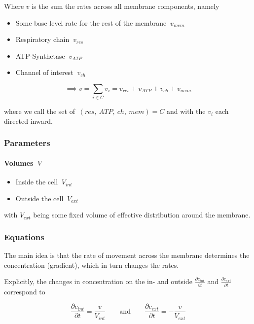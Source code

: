 \documentclass[11pt]{article}
\providecommand{\tightlist}{%
      \setlength{\itemsep}{0pt}\setlength{\parskip}{0pt}}
\begin{document}
Where \(v\) is the sum the rates across all membrane components, namely

\begin{itemize}
\tightlist
\item
  Some base level rate for the rest of the membrane \(\:v_{mem}\)
\item
  Respiratory chain \(\:v_{res}\)
\item
  ATP-Synthetase \(\:v_{ATP}\)
\item
  Channel of interest \(\:v_{ch}\)
\end{itemize}

\[\implies v = \sum_{i \in C} v_i = v_{res} + v_{ATP} + v_{ch} + v_{mem} \]

where we call the set of \(\:(res,\:ATP,\:ch,\:mem) = C\) and with the
\(v_i\) each directed inward.

    \subsubsection{Parameters}\label{parameters}

\paragraph{\texorpdfstring{Volumes
\(\:V\)}{Volumes \textbackslash{}:V}}\label{volumes-v}

\begin{itemize}
\tightlist
\item
  Inside the cell \(\:V_{int}\)
\item
  Outside the cell \(\:V_{ext}\)
\end{itemize}

with \(V_{ext}\) being some fixed volume of effective distribution
around the membrane.

    \subsubsection{Equations}\label{equations}

The main idea is that the rate of movement across the membrane
determines the concentration (gradient), which in turn changes the
rates.

Explicitly, the changes in concentration on the in- and outside
\(\frac{\partial c_{int}}{\partial t}\) and
\(\frac{\partial c_{ext}}{\partial t}\) correspond to

\[\frac{\partial c_{int}}{\partial t} = \frac{v}{V_{int}} \qquad \mathrm{and} \qquad \frac{\partial c_{ext}}{\partial t} = - \frac{v}{V_{ext}}\]
\end{document}
